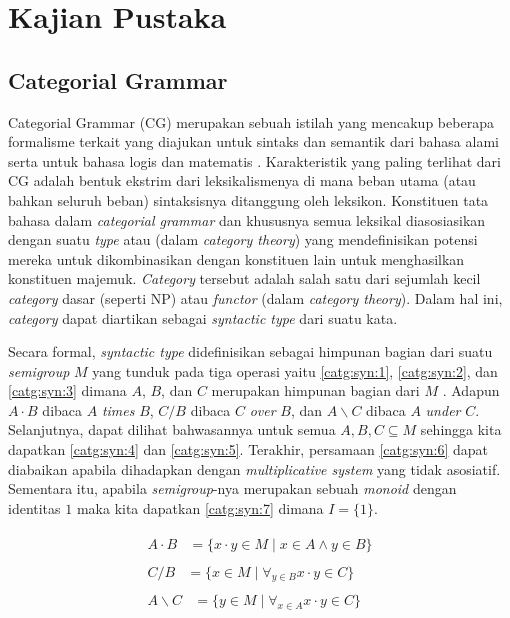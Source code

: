\chapter{Kajian Pustaka}

\section{Categorial Grammar}
Categorial Grammar (CG) merupakan sebuah istilah yang mencakup beberapa formalisme terkait yang diajukan
untuk sintaks dan semantik dari bahasa alami serta untuk bahasa logis dan matematis \cite{Steedman92catg}.
Karakteristik yang paling terlihat dari CG adalah bentuk ekstrim dari leksikalismenya di mana beban utama
(atau bahkan seluruh beban) sintaksisnya ditanggung oleh leksikon.
Konstituen tata bahasa dalam \textit{categorial grammar} dan khususnya semua leksikal diasosiasikan
dengan suatu \textit{type} atau  (dalam \textit{category theory}) yang
mendefinisikan potensi mereka untuk dikombinasikan dengan konstituen lain untuk menghasilkan konstituen
majemuk.
\textit{Category} tersebut adalah salah satu dari sejumlah kecil \textit{category} dasar (seperti NP)
atau \textit{functor} (dalam \textit{category theory}).
Dalam hal ini, \textit{category} dapat diartikan sebagai \textit{syntactic type} dari suatu kata.

Secara formal, \textit{syntactic type} didefinisikan sebagai himpunan bagian dari suatu
\textit{semigroup} $M$ yang tunduk pada tiga operasi yaitu \ref{catg:syn:1},
\ref{catg:syn:2}, dan \ref{catg:syn:3} dimana $A$, $B$, dan $C$ merupakan himpunan bagian dari $M$
\cite{Lambek1988}. Adapun $A \cdot B$ dibaca $A$ \textit{times} $B$, $C/B$ dibaca $C$ \textit{over}
$B$, dan $A\backslash{}C$ dibaca $A$ \textit{under} $C$. Selanjutnya, dapat dilihat bahwasannya
untuk semua $A, B, C \subseteq M$ sehingga kita dapatkan \ref{catg:syn:4} dan \ref{catg:syn:5}.
Terakhir, persamaan \ref{catg:syn:6} dapat diabaikan apabila dihadapkan dengan
\textit{multiplicative system} yang tidak asosiatif. Sementara itu, apabila \textit{semigroup}-nya
merupakan sebuah \textit{monoid} dengan identitas $1$ maka kita dapatkan \ref{catg:syn:7} dimana
$I = \{1\}$.

\begin{align}
  \begin{split}\label{catg:syn:1}
    A \cdot B & = \{x \cdot y \in M \mid x \in A \land y \in B\}
  \end{split}\\
  \begin{split}\label{catg:syn:2}
    C/B & = \{x \in M \mid \forall_{y \in B} x \cdot y \in C\}
  \end{split}\\
  \begin{split}\label{catg:syn:3}
    A\backslash{}C & = \{y \in M \mid \forall_{x \in A} x \cdot y \in C\}
  \end{split}
\end{align}

